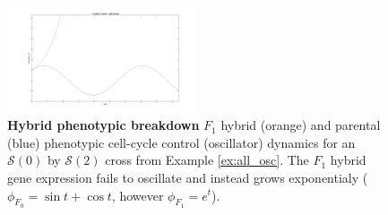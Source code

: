 \documentclass{article}
\newcommand{\1}{\mathbbm{1}}
\newcommand{\Sys}{\mathcal{S}}
\begin{document}
  \begin{figure}[H] 
    \centering
    \includegraphics[width=0.5\textwidth, height=0.125\paperheight]{expF1}
    \caption{\textbf{Hybrid phenotypic breakdown} $F_1$ hybrid (orange) and parental (blue) phenotypic cell-cycle control (oscillator) dynamics for an $\Sys(0)$ by $\Sys(2)$ cross from Example \ref{ex:all_osc}. The $F_1$ hybrid
gene expression fails to oscillate and instead grows exponentialy
($\phi_{F_0}\! = \! \sin t \! + \! \cos t$, however $\phi_{F_1} \! = \! e^t$).
    }
    \label{fig:expF1}
  \end{figure}
%
%
%
\end{document}
